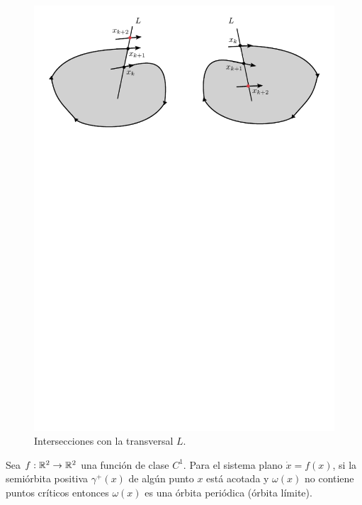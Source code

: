 \begin{figure}[h] \centering
    \includegraphics[scale=1.15]{figures/transversalintersections.pdf}
	\caption{Intersecciones con la transversal $L$.}
	\label{fig:transversalintersections}
\end{figure}

\begin{theorem} \label{teo:poincarebendixson} Sea $f:{\mathbb{R}}^2 \to {\ensuremath{\mathbb{R}}}^2$ una función de clase $C^1$. Para el sistema plano $\dot{x} = f(x)$, si la semiórbita positiva $\gamma^+(x)$ de algún punto $x$ está acotada y $\omega(x)$ no contiene puntos críticos entonces $\omega(x)$ es una órbita periódica (órbita límite).
\end{theorem}

